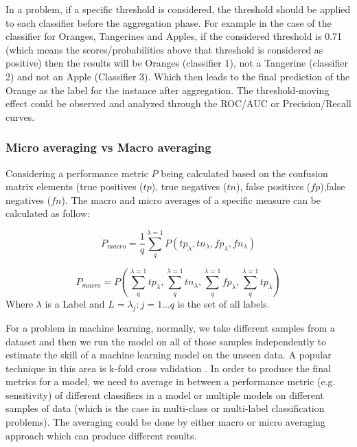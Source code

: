 In a problem, if a specific threshold is considered, the threshold should be applied to each 
classifier before the aggregation phase. For example in the case of the classifier for Oranges, 
Tangerines and Apples, if the considered threshold is 0.71 (which means the scores/probabilities 
above that threshold is considered as positive) then the results will be Oranges (classifier 1), 
not a Tangerine (classifier 2) and not an Apple (Classifier 3). Which then leads to the final 
prediction of the Orange as the label for the instance after aggregation. The threshold-moving 
effect could be observed and analyzed through the ROC/AUC  or Precision/Recall curves.

\subsubsection{Micro averaging vs Macro averaging}
Considering a performance metric $P$ being calculated based on the confusion matrix elements 
(true positives ($tp$), true negatives ($tn$), false positives ($fp$),false negatives ($fn$). 
The macro and micro averages of a specific measure can be calculated as follow:

\begin{equation}
    P_{macro} = \frac{1}{q} \sum_{q}^{\lambda =1} P(tp_{\lambda},tn_{\lambda},fp_{\lambda},fn_{\lambda})
    \label{eq:macro}
\end{equation}

\begin{equation}
    P_{macro} = P (\sum_{q}^{\lambda =1}tp_{\lambda}, \sum_{q}^{\lambda =1}tn_{\lambda}, \sum_{q}^{\lambda =1}fp_{\lambda}, \sum_{q}^{\lambda =1}tp_{\lambda})
    \label{eq:micro}
\end{equation}
Where $\lambda$ is a Label and $L = {\lambda_{j}: j= 1...q}$ is the set of all labels.

For a problem in machine learning, normally, we take different samples from a dataset and then 
we run the model on all of those samples independently to estimate the skill of a machine learning 
model on the unseen data. A popular technique in this area is k-fold cross validation 
\cite{james_introduction_2013}. In order to produce the final metrics for a model, we need 
to average in between a performance metric (e.g. sensitivity) of different classifiers in 
a model or multiple models on different samples of data (which is the case in multi-class 
or multi-label classification problems). The averaging could be done by either macro or 
micro averaging approach which can produce different results.

